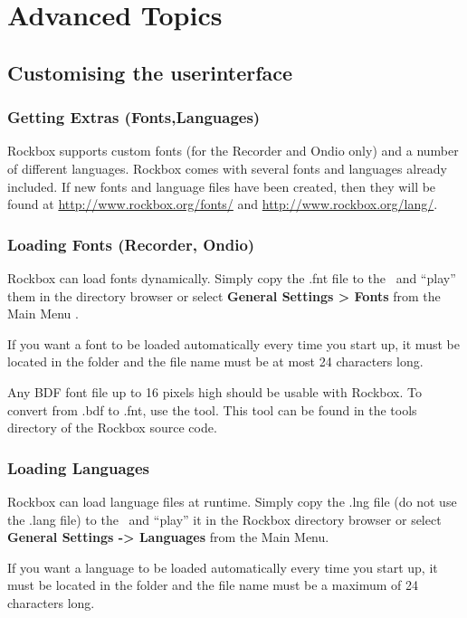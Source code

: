 \chapter{Advanced Topics}

\section{\label{ref:CustomisingUI}Customising the userinterface}
\subsection{\label{ref:GettingExtras}Getting Extras (Fonts,Languages)}
Rockbox supports custom fonts (for the Recorder and Ondio only) and a number of different languages. Rockbox comes with several fonts and languages already included. If new fonts and language files have been created, then they will be found at \url{http://www.rockbox.org/fonts/} and \url{http://www.rockbox.org/lang/}.

\subsection{\label{ref:LoadingForts}Loading Fonts (Recorder, Ondio)}
Rockbox can load fonts dynamically. Simply copy the .fnt file to the \dap\ and ``play'' them in the directory browser or select \textbf{General Settings {\textgreater} Fonts} from the Main Menu .

If you want a font to be loaded automatically every time you start up,
it must be located in the folder and the file name
must be at most 24 characters long.

Any BDF font file up to 16 pixels high should be usable with Rockbox. To
convert from .bdf to .fnt, use the  tool. This tool can be found in the tools directory of the Rockbox source code.

\subsection{\label{ref:Loadinglanguages}Loading Languages}
Rockbox can load language files at runtime. Simply copy the .lng file (do not use the .lang file) to the \dap\ and ``play'' it in the Rockbox directory browser or select \textbf{General Settings {}-{\textgreater} Languages }from the Main Menu.

If you want a language to be loaded automatically every time you start up, it must be located in the folder and the file name must be a maximum of 24 characters long.

